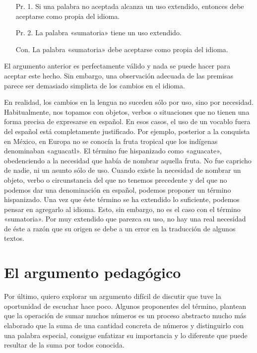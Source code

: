 \documentclass[draft,letter,10pt,notitlepage]{article}
\theoremstyle{definition}
\theoremstyle{remark}
\begin{document}
\begin{itemize}
\item[Pr. 1.] Si una palabra no aceptada alcanza un uso extendido,
  entonces debe aceptarse como propia del idioma.
\item[Pr. 2.] La palabra «sumatoria» tiene un uso extendido.
\item[Con.] La palabra «sumatoria» debe aceptarse como propia del idioma.
\end{itemize}

El argumento anterior es perfectamente válido y nada se puede hacer
para aceptar este hecho. Sin embargo, una observación adecuada de las
premisas parece ser demasiado simplista de los cambios en el idioma.

En realidad, los cambios en la lengua no suceden sólo por uso, sino
por necesidad. Habitualmente, nos topamos con objetos, verbos o
situaciones que no tienen una forma precisa de expresarse en
español. En esos casos, el uso de un vocablo fuera del español está
completamente justificado. Por ejemplo, posterior a la conquista en
México, en Europa no se conocía la fruta tropical que los indígenas
denominaban «aguacatl». El término fue hispanizado como «aguacate»,
obedenciendo a la necesidad que había de nombrar aquella fruta.
No fue capricho de nadie, ni un asunto sólo de uso. Cuando
existe la necesidad de nombrar un objeto, verbo o circunstancia del
que no tenemos precedente y del que no podemos dar una denominación en
español, podemos proponer un término hispanizado. Una vez que éste
término se ha extendido lo suficiente, podemos pensar en agregarlo
al idioma. Esto, sin embargo, no es el caso con el término
«sumatoria». Por muy extendido que parezca su uso, no hay una real
necesidad de éste a razón que su origen se debe a un error en la
traducción de algunos textos.

\section{El argumento pedagógico}
Por último, quiero explorar un argumento difícil de discutir que tuve
la oportunidad de escuchar hace poco. Algunos proponentes del 
término, plantean que la operación de sumar muchos números es un
proceso abstracto mucho más elaborado que la suma de una cantidad
concreta de números y distinguirlo con una palabra
especial, consigue enfatizar su importancia y lo diferente que puede
resultar de la suma por todos conocida.
\end{document}
